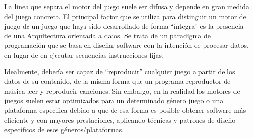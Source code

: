 La linea que separa el motor del juego suele ser difusa y depende en gran medida del juego concreto. El principal factor que se utiliza para distinguir un motor de juego de un juego que haya sido desarrollado de forma ``íntegra'' es la presencia de una Arquitectura orientada a datos. Se trata de un paradigma de programación que se basa en diseñar software con la intención de procesar datos, en lugar de en ejecutar secuencias instrucciones fijas.

Idealmente, debería ser capaz de ``reproducir'' cualquier juego a partir de los datos de su contenido, de la misma forma que un programa reproductor de música leer y reproducir canciones. Sin embargo, en la realidad los motores de juegos suelen estar optimizados para un determinado género juego o una plataforma especifica debido a que de esa forma es posible obtener software más eficiente y con mayores prestaciones, aplicando técnicas y patrones de diseño específicos de esos géneros/plataformas.

